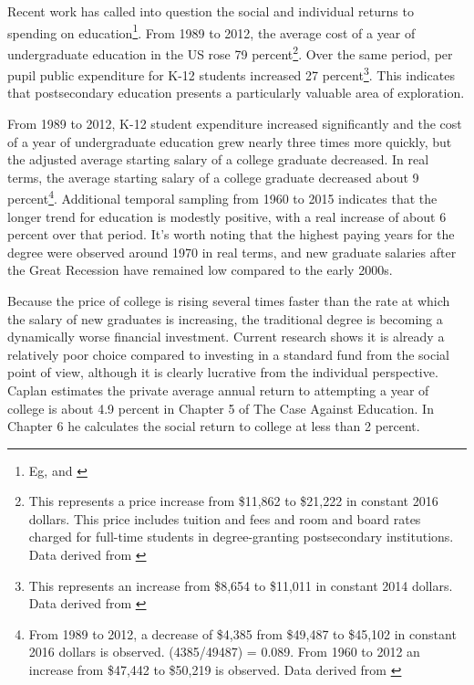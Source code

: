 \documentclass[AER]{./aea-latex-templates/AEA}
\begin{document}
        Recent work has called into question the social and individual returns to spending on
        education\footnote{Eg, \cite{caplan2018case} and \cite{craig_2018}}. From 1989 to 2012, the average cost of a year of undergraduate education
        in the US rose 79 percent\footnote{This represents a price increase from \$11,862 to \$21,222 in constant 2016
        dollars. This price includes tuition and fees and room and board rates charged for full-time students in
        degree-granting postsecondary institutions. Data derived from \cite{nces2017averageundergraduatetuition}}.
        Over the same period, per pupil public expenditure for
        K-12 students increased 27 percent\footnote{This represents an increase from \$8,654 to \$11,011 in constant
        2014 dollars. Data derived from \cite{nces2015expendituresperpupil}}. This indicates that
        postsecondary education presents a particularly valuable area of exploration.
        
        From 1989 to 2012, K-12 student expenditure increased significantly and
        the cost of a year of undergraduate education grew nearly three times more
        quickly, but the adjusted average starting salary of a college graduate
        decreased. In real terms, the average starting salary of a college
        graduate decreased about 9 percent\footnote{From 1989 to 2012, a decrease of \$4,385 from \$49,487 to
        \$45,102 in constant 2016 dollars is observed. (4385/49487) = 0.089. From 1960 to 2012 an increase from
        \$47,442 to \$50,219 is observed. Data derived from \cite{koncz2016}}.
        Additional temporal sampling from 1960 to 2015 indicates that the longer trend for education is modestly positive,
        with a real increase of about 6 percent over that period. It’s worth noting that
        the highest paying years for the degree were observed around 1970 in real
        terms, and new graduate salaries after the Great Recession have remained low
        compared to the early 2000s.
        
        Because the price of college is rising several times faster than the rate
        at which the salary of new graduates is increasing, the traditional degree
        is becoming a dynamically worse financial investment. Current research
        shows it is already a relatively poor choice compared to investing in a
        standard fund from the social point of view, although it is clearly
        lucrative from the individual perspective. Caplan estimates the private
        average annual return to attempting a year of college is about 4.9 percent in
        Chapter 5 of The Case Against Education. In Chapter 6 he calculates the
        social return to college at less than 2 percent.
        
\end{document}

